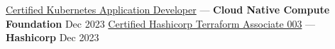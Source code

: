 

\href{https://www.credly.com/badges/f496c372-5779-49d9-b51a-58aff3c5963b/public_url}{Certified Kubernetes Application Developer} --- \textbf{Cloud Native Compute Foundation} \hfill Dec 2023
\href{https://www.credly.com/badges/d0127be5-b859-4703-9c42-62f73ad796ed/public_url}{Certified Hashicorp Terraform Associate 003} --- \textbf{Hashicorp} \hfill Dec 2023

